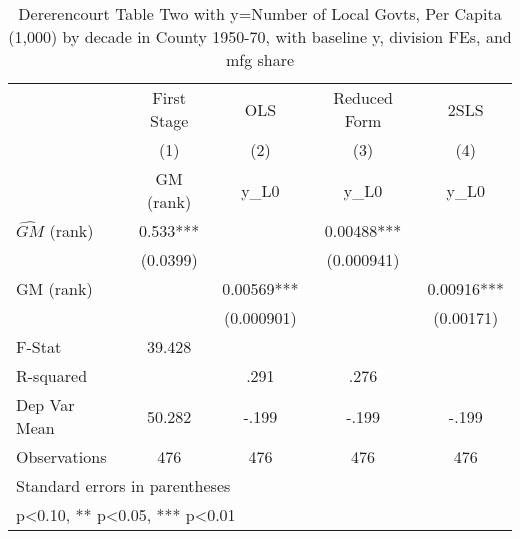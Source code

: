 \begin{table}[htbp]\centering
\def\sym#1{\ifmmode^{#1}\else\(^{#1}\)\fi}
\caption{Dererencourt Table Two with y=Number of Local Govts, Per Capita (1,000) by decade in County 1950-70, with baseline y, division FEs, and mfg share}
\begin{tabular}{l*{4}{c}}
\toprule
                    & First Stage   &         OLS   &Reduced Form   &        2SLS   \\
                    &\multicolumn{1}{c}{(1)}&\multicolumn{1}{c}{(2)}&\multicolumn{1}{c}{(3)}&\multicolumn{1}{c}{(4)}\\
                    &\multicolumn{1}{c}{GM  (rank)}&\multicolumn{1}{c}{y\_L0}&\multicolumn{1}{c}{y\_L0}&\multicolumn{1}{c}{y\_L0}\\
\midrule
$\hat{GM}$ (rank)   &       0.533***&               &     0.00488***&               \\
                    &    (0.0399)   &               &  (0.000941)   &               \\
\addlinespace
GM  (rank)          &               &     0.00569***&               &     0.00916***\\
                    &               &  (0.000901)   &               &   (0.00171)   \\
\midrule
F-Stat              &      39.428   &               &               &               \\
R-squared           &               &        .291   &        .276   &               \\
Dep Var Mean        &      50.282   &       -.199   &       -.199   &       -.199   \\
Observations        &         476   &         476   &         476   &         476   \\
\bottomrule
\multicolumn{5}{l}{\footnotesize Standard errors in parentheses}\\
\multicolumn{5}{l}{\footnotesize * p<0.10, ** p<0.05, *** p<0.01}\\
\end{tabular}
\end{table}
